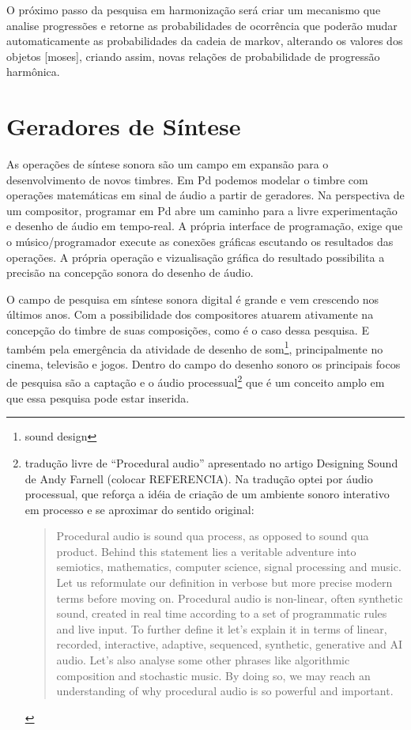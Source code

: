 \documentclass{ppgmus}
\begin{document}
O próximo passo da pesquisa em harmonização será criar um mecanismo que analise progressões
 e retorne as probabilidades de ocorrência que poderão mudar automaticamente as probabilidades
da cadeia de markov, alterando os valores dos objetos [moses], criando assim, novas relações
de probabilidade de progressão harmônica.

\pagebreak

\section{Geradores de Síntese}

As operações de síntese sonora são um campo em expansão para o
desenvolvimento de novos timbres. Em Pd podemos modelar
o timbre com operações matemáticas em sinal de
áudio a partir de geradores.
Na perspectiva de um compositor, programar em Pd abre um caminho
 para a livre experimentação e desenho
de áudio em tempo-real. A própria interface de
programação, exige que o músico/programador execute as 
conexões gráficas escutando os resultados das operações.
 A própria operação e vizualisação gráfica 
do resultado possibilita a precisão na concepção sonora do desenho
de áudio. 


O campo de pesquisa em síntese sonora digital é grande e vem crescendo
nos últimos anos. Com a possibilidade dos compositores atuarem ativamente
na concepção do timbre de suas composições, como é o caso dessa pesquisa. E
também pela emergência da atividade de desenho  de som\footnote{sound design}, 
principalmente no cinema, televisão e jogos. Dentro do campo do desenho
sonoro os principais focos de pesquisa são a captação e o áudio
processual\footnote{tradução livre de ``Procedural audio'' apresentado no artigo
 Designing Sound de Andy Farnell (colocar REFERENCIA). Na tradução optei por
áudio processual, que reforça a idéia de criação de um ambiente sonoro interativo
em processo e se aproximar do sentido original:

\begin{quotation}
 Procedural audio is sound qua process, as opposed to sound qua product. Behind this statement lies 
a veritable adventure into semiotics, mathematics, computer science, signal processing and music. 
Let us reformulate our definition in verbose but more precise modern terms before moving on. 
Procedural audio is non-linear, often synthetic sound, created in real time according to a set 
of programmatic rules and live input. To further define it let's explain it in terms of linear, 
recorded, interactive, adaptive, sequenced, synthetic, generative and AI audio. 
Let's also analyse some other phrases like algorithmic composition and stochastic music. 
By doing so, we may reach an understanding of why procedural audio is so powerful and important.
\end{quotation} 
} que é um conceito amplo em que essa pesquisa pode estar inserida. 
\end{document}
